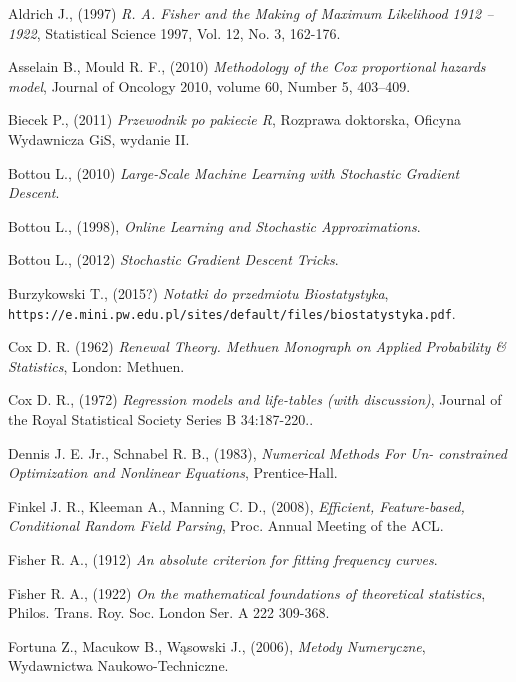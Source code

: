 \begin{thebibliography}{99}

 Aldrich J., (1997) \textit{R. A. Fisher and the Making of Maximum Likelihood 1912 – 1922}, Statistical Science
1997, Vol. 12, No. 3, 162-176.

 Asselain B., Mould R. F., (2010) \textit{Methodology of the Cox proportional hazards model},  Journal of Oncology 2010, volume 60, Number 5,  403–409.

 Biecek P., (2011) \textit{Przewodnik po pakiecie R}, Rozprawa doktorska, Oficyna Wydawnicza GiS, wydanie II.

 Bottou L., (2010) \textit{Large-Scale Machine Learning with Stochastic Gradient Descent}.

 Bottou L., (1998), \textit{Online Learning and Stochastic
Approximations}.


 Bottou L., (2012) \textit{Stochastic Gradient Descent Tricks}.

 Burzykowski T., (2015?) \textit{Notatki do przedmiotu Biostatystyka}, \texttt{https://e.mini.pw.edu.pl/sites/default/files/biostatystyka.pdf}.

 Cox D. R. (1962) \textit{Renewal Theory. Methuen Monograph on Applied Probability
\& Statistics}, London: Methuen.

  Cox D. R., (1972) \textit{Regression models and life-tables (with discussion)}, Journal of the Royal Statistical Society Series B 34:187-220.. 

 Dennis J. E. Jr., Schnabel R. B., (1983), \textit{Numerical Methods For Un-
constrained Optimization and Nonlinear Equations}, Prentice-Hall.


  Finkel J. R., Kleeman A., Manning C. D., (2008), \textit{Efficient, Feature-based, Conditional Random Field Parsing}, Proc. Annual Meeting of the ACL.

 Fisher R. A., (1912) \textit{An absolute criterion for fitting frequency curves}. 

 Fisher R. A., (1922) \textit{On the mathematical foundations of theoretical statistics}, Philos. Trans. Roy. Soc. London Ser. A 222 309-368.

 Fortuna Z., Macukow B., Wąsowski J., (2006), \textit{Metody Numeryczne}, Wydawnictwa Naukowo-Techniczne.


\end{thebibliography}
